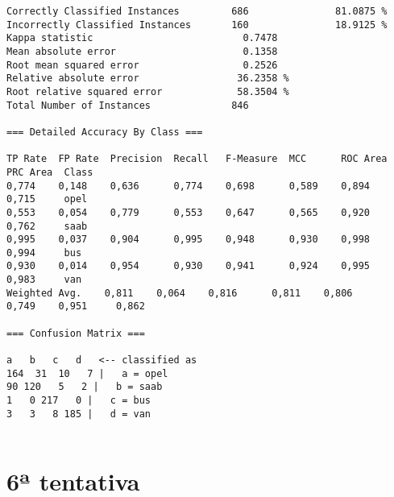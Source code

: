 \documentclass[
	article,			%
	11pt,				%
	oneside,			%
	a4paper,			%
	english,			%
	brazil,				%
	sumario=tradicional
	]{abntex2}
\begin{document}
\begin{lstlisting}
Correctly Classified Instances         686               81.0875 %
Incorrectly Classified Instances       160               18.9125 %
Kappa statistic                          0.7478
Mean absolute error                      0.1358
Root mean squared error                  0.2526
Relative absolute error                 36.2358 %
Root relative squared error             58.3504 %
Total Number of Instances              846     

=== Detailed Accuracy By Class ===

TP Rate  FP Rate  Precision  Recall   F-Measure  MCC      ROC Area  PRC Area  Class
0,774    0,148    0,636      0,774    0,698      0,589    0,894     0,715     opel
0,553    0,054    0,779      0,553    0,647      0,565    0,920     0,762     saab
0,995    0,037    0,904      0,995    0,948      0,930    0,998     0,994     bus
0,930    0,014    0,954      0,930    0,941      0,924    0,995     0,983     van
Weighted Avg.    0,811    0,064    0,816      0,811    0,806      0,749    0,951     0,862     

=== Confusion Matrix ===

a   b   c   d   <-- classified as
164  31  10   7 |   a = opel
90 120   5   2 |   b = saab
1   0 217   0 |   c = bus
3   3   8 185 |   d = van


\end{lstlisting}

\newpage

\section{6ª tentativa}
\end{document}
